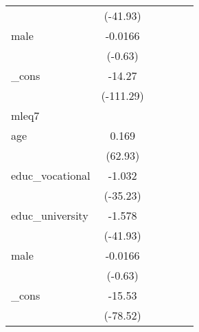 {\begin{tabular}{l*{5}{c}}
            &    (-41.93)         &                     &                     &                     &                     \\
[1em]
male        &     -0.0166         &                     &                     &                     &                     \\
            &     (-0.63)         &                     &                     &                     &                     \\
[1em]
\_cons      &      -14.27\sym{***}&                     &                     &                     &                     \\
            &   (-111.29)         &                     &                     &                     &                     \\
\hline
mleq7       &                     &                     &                     &                     &                     \\
age         &       0.169\sym{***}&                     &                     &                     &                     \\
            &     (62.93)         &                     &                     &                     &                     \\
[1em]
educ\_vocational&      -1.032\sym{***}&                     &                     &                     &                     \\
            &    (-35.23)         &                     &                     &                     &                     \\
[1em]
educ\_university&      -1.578\sym{***}&                     &                     &                     &                     \\
            &    (-41.93)         &                     &                     &                     &                     \\
[1em]
male        &     -0.0166         &                     &                     &                     &                     \\
            &     (-0.63)         &                     &                     &                     &                     \\
[1em]
\_cons      &      -15.53\sym{***}&                     &                     &                     &                     \\
            &    (-78.52)         &                     &                     &                     &                     \\

\end{tabular}}

